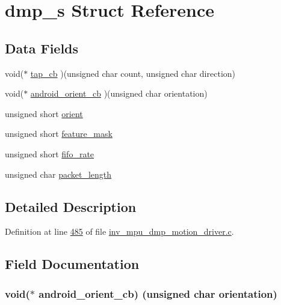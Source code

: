 \hypertarget{structdmp__s}{}\section{dmp\+\_\+s Struct Reference}
\label{structdmp__s}
\subsection*{Data Fields}
\begin{DoxyCompactItemize}
\item 
void($\ast$ \hyperlink{structdmp__s_a45a59366dd83331a3ae376edeb5b9e94}{tap\+\_\+cb} )(unsigned char count, unsigned char direction)
\item 
void($\ast$ \hyperlink{structdmp__s_a4ae9e6ba505d73d0db861f6ca28c1a3a}{android\+\_\+orient\+\_\+cb} )(unsigned char orientation)
\item 
unsigned short \hyperlink{structdmp__s_ac949b11ebfe17c3a2ac42785a1437c25}{orient}
\item 
unsigned short \hyperlink{structdmp__s_ac1c048fa56b613b3223d2e66ac2c050f}{feature\+\_\+mask}
\item 
unsigned short \hyperlink{structdmp__s_a4aec83107ddc0d95ddf30cce1b7e6465}{fifo\+\_\+rate}
\item 
unsigned char \hyperlink{structdmp__s_a6423143ff761c75d97f34c8465393ea0}{packet\+\_\+length}
\end{DoxyCompactItemize}


\subsection{Detailed Description}


Definition at line \hyperlink{inv__mpu__dmp__motion__driver_8c_source_l00485}{485} of file \hyperlink{inv__mpu__dmp__motion__driver_8c_source}{inv\+\_\+mpu\+\_\+dmp\+\_\+motion\+\_\+driver.\+c}.



\subsection{Field Documentation}
\subsubsection[{\texorpdfstring{android\+\_\+orient\+\_\+cb}{android_orient_cb}}]{\setlength{\rightskip}{0pt plus 5cm}void($\ast$ android\+\_\+orient\+\_\+cb) (unsigned char orientation)}\hypertarget{structdmp__s_a4ae9e6ba505d73d0db861f6ca28c1a3a}{}\label{structdmp__s_a4ae9e6ba505d73d0db861f6ca28c1a3a}


